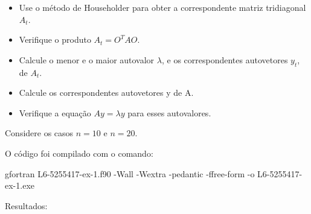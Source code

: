 \documentclass[12pt, a4paper]{article} %
\begin{document}
        \begin{itemize}
            \item Use o método de Householder para obter a correspondente matriz tridiagonal $A_{t}$.
        
            \item Verifique o produto $A_{t} = O^{T}AO$.
        
            \item Calcule o menor e o maior autovalor $\lambda$, e os correspondentes autovetores $y_{t}$, de $A_{t}$.
        
            \item Calcule os correspondentes autovetores y de A.
        
            \item Verifique a equação $Ay = \lambda y$ para esses autovalores.
        
        \end{itemize}
        
        Considere os casos $n=10$ e $n=20$.
        
        O c\'odigo foi compilado com o comando:

    gfortran L6-5255417-ex-1.f90 -Wall -Wextra -pedantic -ffree-form -o L6-5255417-ex-1.exe

        Resultados:
\end{document}
